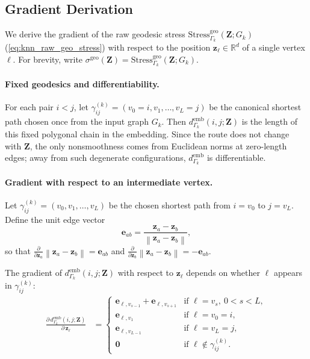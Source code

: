 \documentclass[twoside,11pt]{article}
\newcommand{\R}{\mathbb{R}}
\newcommand{\bz}{\mathbf{z}}
\newcommand{\bZ}{\mathbf{Z}}
\newcommand{\norm}[1]{\left\|#1\right\|}
\newcommand{\demb}{d^{\mathrm{emb}}}
\newcommand{\Gk}{G_k}
\newcommand{\Stress}{\mathrm{Stress}}
\begin{document}
\subsection{Gradient Derivation}
\label{sec:gradient}

We derive the gradient of the raw geodesic stress
$\Stress^{\mathrm{geo}}_{\Gamma_k}(\bZ; \Gk)$
(\cref{eq:knn_raw_geo_stress}) with respect to the position
$\bz_\ell \in \R^d$ of a single vertex $\ell$.  For brevity, write
$\sigma^{\mathrm{geo}}(\bZ) = \Stress^{\mathrm{geo}}_{\Gamma_k}(\bZ; \Gk)$.

\paragraph{Fixed geodesics and differentiability.}
For each pair $i < j$, let
$\gamma_{ij}^{(k)} = (v_0 = i, v_1, \ldots, v_L = j)$ be the canonical
shortest path chosen once from the input graph $\Gk$.  Then
$\demb_{\Gamma_k}(i,j;\bZ)$ is the length of this fixed polygonal chain in the
embedding.  Since the route does not change with $\bZ$, the only
nonsmoothness comes from Euclidean norms at zero-length edges; away from
such degenerate configurations, $\demb_{\Gamma_k}$ is differentiable.

\paragraph{Gradient with respect to an intermediate vertex.}
Let $\gamma_{ij}^{(k)} = (v_0, v_1, \ldots, v_L)$ be the chosen shortest
path from $i = v_0$ to $j = v_L$.  Define the unit edge vector
\begin{equation}
  \mathbf{e}_{ab} = \frac{\bz_a - \bz_b}{\norm{\bz_a - \bz_b}},
  \label{eq:unit_edge}
\end{equation}
so that $\frac{\partial}{\partial \bz_a}\norm{\bz_a - \bz_b} = \mathbf{e}_{ab}$
and $\frac{\partial}{\partial \bz_b}\norm{\bz_a - \bz_b} = -\mathbf{e}_{ab}$.

The gradient of $\demb_{\Gamma_k}(i,j;\bZ)$ with respect to $\bz_\ell$ depends on
whether $\ell$ appears in $\gamma_{ij}^{(k)}$:
\begin{align}
  \frac{\partial\, \demb_{\Gamma_k}(i,j;\bZ)}{\partial\, \bz_\ell}
  &= \begin{cases}
       \mathbf{e}_{\ell, v_{s-1}} + \mathbf{e}_{\ell, v_{s+1}}
         & \text{if } \ell = v_s,\ 0 < s < L, \\
       \mathbf{e}_{\ell, v_1}
         & \text{if } \ell = v_0 = i, \\
       \mathbf{e}_{\ell, v_{L-1}}
         & \text{if } \ell = v_L = j, \\
       \bm{0}
         & \text{if } \ell \notin \gamma_{ij}^{(k)}.
     \end{cases}
  \label{eq:geo_distance_gradient}
\end{align}
\end{document}
